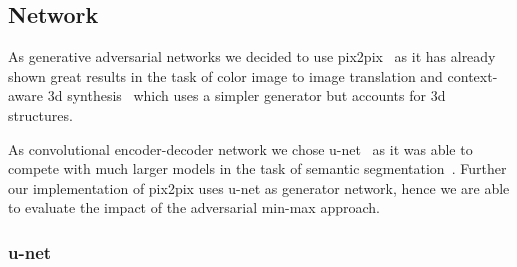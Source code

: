 \subsection{Network}

As generative adversarial networks we decided to use pix2pix~\cite{Isola16}
as it has already shown great results in the task of color image to image
translation and context-aware 3d synthesis~\cite{Nie16} which uses a simpler
generator but accounts for 3d structures.

As convolutional encoder-decoder network we chose u-net~\cite{Ronneberger15}
as it was able to compete with much larger models in the task of semantic
segmentation~\cite{Badrinarayanan15}. Further our implementation of pix2pix
uses u-net as generator network, hence we are able to evaluate the impact
of the adversarial min-max approach.

\subsubsection{u-net}

